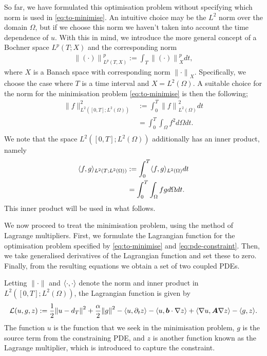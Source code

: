 So far, we have formulated this optimisation problem without specifying which norm is used in \autoref{eq:to-minimise}. An intuitive choice may be the $L^2$ norm over the domain $\Omega$, but if we choose this norm we haven't taken into account the time dependence of $u$. With this in mind, we introduce the more general concept of a Bochner space $L^p(T;X)$ and the corresponding norm
%
\begin{align} 
    {\lVert (\cdot) \rVert}^p_{L^p(T,X)} := \int_{T} {\lVert (\cdot)\rVert}^p_X dt, 
\end{align}
%
where $X$ is a Banach space with corresponding norm ${\lVert \cdot\rVert}_X$. Specifically, we choose the case where $T$ is a time interval and $X=L^2(\Omega)$. A suitable choice for the norm for the minimisation problem \autoref{eq:to-minimise} is then the following;
%
\begin{align} 
    \lVert f \rVert_{L^2([0,T];L^2(\Omega))}^2 &:= \int_{0}^{T}  {\lVert f \rVert}^2_{L^2(\Omega)} dt\\
    &= \int_{0}^{T} \int_{\Omega} f^2 d\Omega dt.\\
\end{align}
%
We note that the space $L^2([0,T];L^2(\Omega))$ additionally has an inner product, namely
%
\begin{align} 
    \langle f, g \rangle_{L^2(T;L^2(\Omega))} &:= \int_{0}^{T} \langle f, g \rangle_{L^2(\Omega)} dt \\
    & = \int_{0}^{T} \int_{\Omega} fg d\Omega dt.
\end{align}
%
This inner product will be used in what follows.

We now proceed to treat the minimisation problem, using the method of Lagrange multipliers. First, we formulate the Lagrangian function for the optimisation problem specified by \autoref{eq:to-minimise} and \autoref{eq:pde-constraint}. Then, we take generalised derivatives of the Lagrangian function and set these to zero. Finally, from the resulting equations we obtain a set of two coupled PDEs.

Letting $\lVert \cdot \rVert$ and $\langle \cdot, \cdot \rangle$ denote the norm and inner product in $L^2([0,T];L^2(\Omega))$, the Lagrangian function is given by
%
\begin{align} 
    \mathcal{L}(u,g,z) := \frac{1}{2} {\lVert u - d_T \rVert}^2 + \frac{\alpha}{2} {\lVert g \rVert}^2 - \langle u, \partial_t z \rangle - \langle u, \boldsymbol{b} \cdot \nabla z \rangle + \langle \nabla u, \boldsymbol{A} \nabla z \rangle - \langle g, z \rangle.
\end{align}
%
The function $u$ is the function that we seek in the minimisation problem, $g$ is the source term from the constraining PDE, and $z$ is another function known as the Lagrange multiplier, which is introduced to capture the constraint. 

